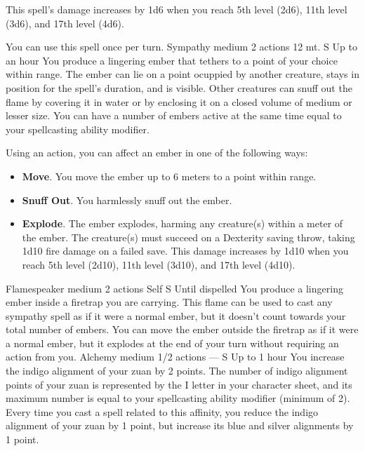     This spell's damage increases by 1d6 when you reach 5th level (2d6), 11th level (3d6), and 17th level (4d6).

    You can use this spell once per turn.
    {Sympathy medium}
    {2 actions}
    {12 mt.}
    {S}
    {Up to an hour}
    You produce a lingering ember that tethers to a point of your choice within range.
    The ember can lie on a point ocuppied by another creature, stays in position for the spell's duration, and is visible.
    Other creatures can snuff out the flame by covering it in water or by enclosing it on a closed volume of medium or lesser size.
    You can have a number of embers active at the same time equal to your spellcasting ability modifier.

    Using an action, you can affect an ember in one of the following ways:
    \begin{itemize}
        \item \textbf{Move}.
        You move the ember up to 6 meters to a point within range.
        \item \textbf{Snuff Out}.
        You harmlessly snuff out the ember.
        \item \textbf{Explode}.
        The ember explodes, harming any creature(s) within a meter of the ember.
        The creature(s) must succeed on a Dexterity saving throw, taking 1d10 fire damage on a failed save.
        This damage increases by 1d10 when you reach 5th level (2d10), 11th level (3d10), and 17th level (4d10).
    \end{itemize}
    {Flamespeaker medium}
    {2 actions}
    {Self}
    {S}
    {Until dispelled}
    You produce a lingering ember inside a firetrap you are carrying.
    This flame can be used to cast any sympathy spell as if it were a normal ember, but it doesn't count towards your total number of embers.
    You can move the ember outside the firetrap as if it were a normal ember, but it explodes at the end of your turn without requiring an action from you.
    {Alchemy medium}
    {1/2 actions}
    {---}
    {S}
    {Up to 1 hour}
    You increase the indigo alignment of your zuan by 2 points.
    The number of indigo alignment points of your zuan is represented by the I letter in your character sheet, and its maximum number is equal to your spellcasting ability modifier (minimum of 2).
    Every time you cast a spell related to this affinity, you reduce the indigo alignment of your zuan by 1 point, but increase its blue and silver alignments by 1 point.

